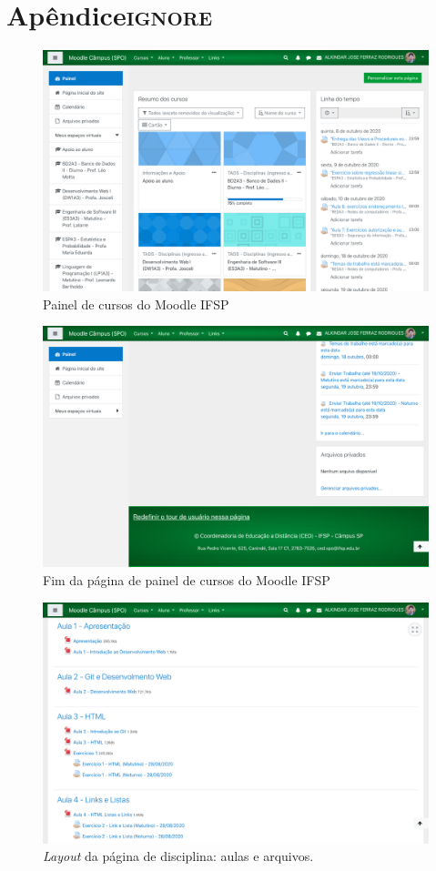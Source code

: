 \documentclass[11pt]{article}
\begin{document}
\section*{Apêndice\hfill{}\textsc{ignore}}
\label{sec:org37e17ab}
\begin{figure}[htbp]
\centering
\includegraphics[width=.9\linewidth]{./media/painel.png}
\caption{\label{fig:org20b483b}Painel de cursos do Moodle IFSP}
\end{figure}
\begin{figure}[htbp]
\centering
\includegraphics[width=.9\linewidth]{./media/painel_fim.png}
\caption{\label{fig:org4a1469f}Fim da página de painel de cursos do Moodle IFSP}
\end{figure}
\begin{figure}[htbp]
\centering
\includegraphics[width=.9\linewidth]{./media/disc_1.png}
\caption[\emph{Layout}]{\label{fig:org175281c}\emph{Layout} da página de disciplina: aulas e arquivos.}
\end{figure}
\end{document}
